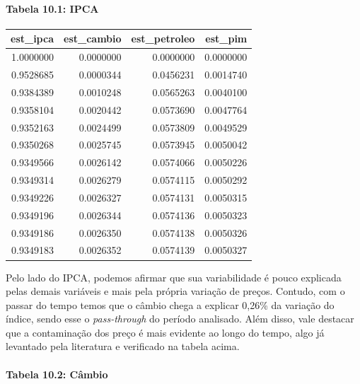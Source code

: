 \documentclass[12pt]{article}
\begin{document}
\hypertarget{tabela-10.1-ipca}{%
\paragraph{Tabela 10.1: IPCA}\label{tabela-10.1-ipca}}

\begin{longtable}[]{@{}rrrr@{}}
\toprule
est\_ipca & est\_cambio & est\_petroleo & est\_pim \\
\midrule
\endhead
1.0000000 & 0.0000000 & 0.0000000 & 0.0000000 \\
0.9528685 & 0.0000344 & 0.0456231 & 0.0014740 \\
0.9384389 & 0.0010248 & 0.0565263 & 0.0040100 \\
0.9358104 & 0.0020442 & 0.0573690 & 0.0047764 \\
0.9352163 & 0.0024499 & 0.0573809 & 0.0049529 \\
0.9350268 & 0.0025745 & 0.0573945 & 0.0050042 \\
0.9349566 & 0.0026142 & 0.0574066 & 0.0050226 \\
0.9349314 & 0.0026279 & 0.0574115 & 0.0050292 \\
0.9349226 & 0.0026327 & 0.0574131 & 0.0050315 \\
0.9349196 & 0.0026344 & 0.0574136 & 0.0050323 \\
0.9349186 & 0.0026350 & 0.0574138 & 0.0050326 \\
0.9349183 & 0.0026352 & 0.0574139 & 0.0050327 \\
\bottomrule
\end{longtable}

Pelo lado do IPCA, podemos afirmar que sua variabilidade é pouco
explicada pelas demais variáveis e mais pela própria variação de preços.
Contudo, com o passar do tempo temos que o câmbio chega a explicar
0,26\% da variação do índice, sendo esse o \emph{pass-through} do
período analisado. Além disso, vale destacar que a contaminação dos
preço é mais evidente ao longo do tempo, algo já levantado pela
literatura e verificado na tabela acima.

\hypertarget{tabela-10.2-cuxe2mbio}{%
\paragraph{Tabela 10.2: Câmbio}\label{tabela-10.2-cuxe2mbio}}
\end{document}
